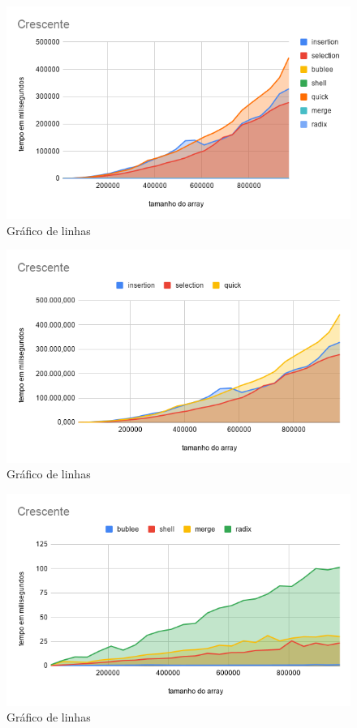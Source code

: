 \documentclass[a4paper, 12pt]{article}
\begin{document}
	\begin{figure}[!h]
	\caption{ Gráfico de linhas }
	\label{fig:crescente1}
	\centering
	\includegraphics[width=1\textwidth, height=0.60\textwidth]{Crescente}
	
\end{figure}
\begin{figure}[!h]
	\caption{ Gráfico de linhas }
	\label{fig:crescente2}
	\centering
	\includegraphics[width=1\textwidth, height=0.57\textwidth]{Crescente1}
\end{figure}

\begin{figure}[!h]
	\caption{ Gráfico de linhas }
	\label{fig:crescente3}
	\centering
	\includegraphics[width=1\textwidth, height=0.57\textwidth]{Crescente2}
\end{figure}
\newpage
\end{document}

